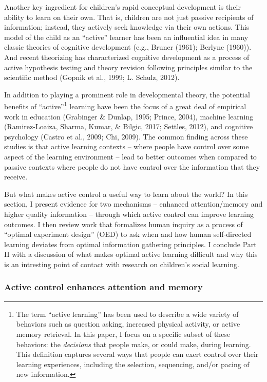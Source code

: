 \documentclass[a4paper,man,apacite,floatsintext]{apa6}
\begin{document}
Another key ingredient for children's rapid conceptual development is
their ability to learn on their own. That is, children are not just
passive recipients of information; instead, they actively seek knowledge
via their own actions. This model of the child as an ``active'' learner
has been an influential idea in many classic theories of cognitive
development (e.g., Bruner (1961); Berlyne (1960)). And recent theorizing
has characterized cognitive development as a process of active
hypothesis testing and theory revision following principles similar to
the scientific method (Gopnik et al., 1999; L. Schulz, 2012).

In addition to playing a prominent role in developmental theory, the
potential benefits of ``active''\footnote{The term ``active learning''
  has been used to describe a wide variety of behaviors such as question
  asking, increased physical activity, or active memory retrieval. In
  this paper, I focus on a specific subset of these behaviors: the
  \emph{decisions} that people make, or could make, during learning.
  This definition captures several ways that people can exert control
  over their learning experiences, including the selection, sequencing,
  and/or pacing of new information.} learning have been the focus of a
great deal of empirical work in education (Grabinger \& Dunlap, 1995;
Prince, 2004), machine learning (Ramirez-Loaiza, Sharma, Kumar, \&
Bilgic, 2017; Settles, 2012), and cognitive psychology (Castro et al.,
2009; Chi, 2009). The common finding across these studies is that active
learning contexts -- where people have control over some aspect of the
learning environment -- lead to better outcomes when compared to passive
contexts where people do not have control over the information that they
receive.

But what makes active control a useful way to learn about the world? In
this section, I present evidence for two mechanisms -- enhanced
attention/memory and higher quality information -- through which active
control can improve learning outcomes. I then review work that
formalizes human inquiry as a process of ``optimal experiment design''
(OED) to ask when and how human self-directed learning deviates from
optimal information gathering principles. I conclude Part II with a
discussion of what makes optimal active learning difficult and why this
is an intresting point of contact with research on children's social
learning.

\subsubsection{Active control enhances attention and
memory}\label{active-control-enhances-attention-and-memory}
\end{document}
